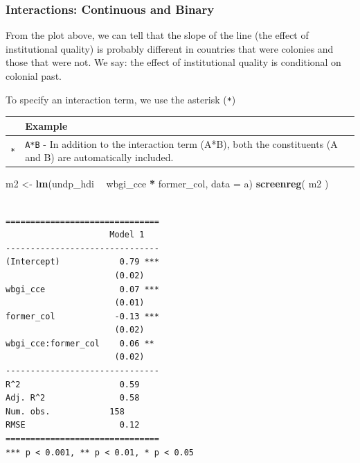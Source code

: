 \documentclass[]{article}
\newenvironment{Shaded}{\begin{snugshade}}{\end{snugshade}}
\newcommand{\KeywordTok}[1]{\textcolor[rgb]{0.13,0.29,0.53}{\textbf{#1}}}
\newcommand{\DataTypeTok}[1]{\textcolor[rgb]{0.13,0.29,0.53}{#1}}
\newcommand{\StringTok}[1]{\textcolor[rgb]{0.31,0.60,0.02}{#1}}
\newcommand{\OperatorTok}[1]{\textcolor[rgb]{0.81,0.36,0.00}{\textbf{#1}}}
\newcommand{\NormalTok}[1]{#1}
\theoremstyle{definition}
\theoremstyle{definition}
\theoremstyle{definition}
\theoremstyle{remark}
\begin{document}
\subsubsection{Interactions: Continuous and
Binary}\label{interactions-continuous-and-binary}

From the plot above, we can tell that the slope of the line (the effect
of institutional quality) is probably different in countries that were
colonies and those that were not. We say: the effect of institutional
quality is conditional on colonial past.

To specify an interaction term, we use the asterisk (\texttt{*})

\begin{longtable}[]{@{}ll@{}}
\toprule
\begin{minipage}[b]{0.04\columnwidth}\raggedright\strut
\strut
\end{minipage} & \begin{minipage}[b]{0.72\columnwidth}\raggedright\strut
Example\strut
\end{minipage}\tabularnewline
\midrule
\endhead
\begin{minipage}[t]{0.04\columnwidth}\raggedright\strut
\texttt{*}\strut
\end{minipage} & \begin{minipage}[t]{0.72\columnwidth}\raggedright\strut
\texttt{A*B} - In addition to the interaction term (A*B), both the
constituents (A and B) are automatically included.\strut
\end{minipage}\tabularnewline
\bottomrule
\end{longtable}

\begin{Shaded}
\begin{Highlighting}[]
\NormalTok{m2 <-}\StringTok{ }\KeywordTok{lm}\NormalTok{(undp_hdi }\OperatorTok{~}\StringTok{ }\NormalTok{wbgi_cce }\OperatorTok{*}\StringTok{ }\NormalTok{former_col, }\DataTypeTok{data =}\NormalTok{ a)}
\KeywordTok{screenreg}\NormalTok{( m2 )}
\end{Highlighting}
\end{Shaded}

\begin{verbatim}

===============================
                     Model 1   
-------------------------------
(Intercept)            0.79 ***
                      (0.02)   
wbgi_cce               0.07 ***
                      (0.01)   
former_col            -0.13 ***
                      (0.02)   
wbgi_cce:former_col    0.06 ** 
                      (0.02)   
-------------------------------
R^2                    0.59    
Adj. R^2               0.58    
Num. obs.            158       
RMSE                   0.12    
===============================
*** p < 0.001, ** p < 0.01, * p < 0.05
\end{verbatim}
\end{document}
